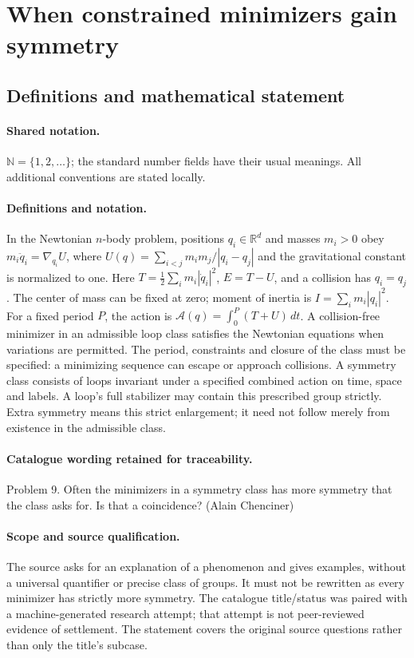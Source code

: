 \documentclass[11pt]{article}
\begin{document}
\section{When constrained minimizers gain symmetry}\label{statement}

\subsection{Definitions and mathematical statement}

\paragraph{Shared notation.}$\mathbb N=\{1,2,\ldots\}$; the standard number fields have their usual meanings. All additional conventions are stated locally.


\paragraph{Definitions and notation.}In the Newtonian $n$-body problem, positions $q_i\in\mathbb R^d$ and masses $m_i>0$ obey $m_i\ddot q_i=\nabla_{q_i}U$, where $U(q)=\sum_{i<j}m_im_j/|q_i-q_j|$ and the gravitational constant is normalized to one. Here $T=\tfrac12\sum_i m_i|\dot q_i|^2$, $E=T-U$, and a collision has $q_i=q_j$. The center of mass can be fixed at zero; moment of inertia is $I=\sum_i m_i|q_i|^2$. For a fixed period $P$, the action is $\mathcal A(q)=\int_0^P(T+U)\,dt$. A collision-free minimizer in an admissible loop class satisfies the Newtonian equations when variations are permitted. The period, constraints and closure of the class must be specified: a minimizing sequence can escape or approach collisions. A symmetry class consists of loops invariant under a specified combined action on time, space and labels. A loop’s full stabilizer may contain this prescribed group strictly. Extra symmetry means this strict enlargement; it need not follow merely from existence in the admissible class.

\paragraph{Catalogue wording retained for traceability.}
Problem 9. Often the minimizers in a symmetry class has more symmetry that the class asks for. Is that a coincidence? (Alain Chenciner)
\paragraph{Scope and source qualification.}The source asks for an explanation of a phenomenon and gives examples, without a universal quantifier or precise class of groups. It must not be rewritten as every minimizer has strictly more symmetry. The catalogue title/status was paired with a machine-generated research attempt; that attempt is not peer-reviewed evidence of settlement. The statement covers the original source questions rather than only the title’s subcase.
\end{document}
